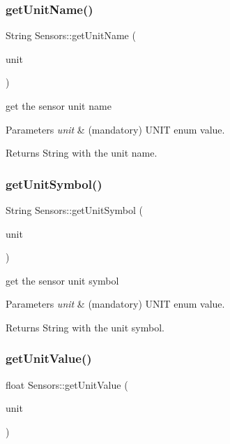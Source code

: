 \subsubsection{\texorpdfstring{get\+Unit\+Name()}{getUnitName()}}
{\footnotesize\ttfamily String Sensors\+::get\+Unit\+Name (\begin{DoxyParamCaption}\item[{U\+N\+IT}]{unit }\end{DoxyParamCaption})}



get the sensor unit name 


\begin{DoxyParams}{Parameters}
{\em unit} & (mandatory) U\+N\+IT enum value. \\
\hline
\end{DoxyParams}
\begin{DoxyReturn}{Returns}
String with the unit name. 
\end{DoxyReturn}
\mbox{\label{classSensors_a365a45dc5c9ab598cfc206368579b94a}} 
\subsubsection{\texorpdfstring{get\+Unit\+Symbol()}{getUnitSymbol()}}
{\footnotesize\ttfamily String Sensors\+::get\+Unit\+Symbol (\begin{DoxyParamCaption}\item[{U\+N\+IT}]{unit }\end{DoxyParamCaption})}



get the sensor unit symbol 


\begin{DoxyParams}{Parameters}
{\em unit} & (mandatory) U\+N\+IT enum value. \\
\hline
\end{DoxyParams}
\begin{DoxyReturn}{Returns}
String with the unit symbol. 
\end{DoxyReturn}
\mbox{\label{classSensors_a7e75dd4e3f2e655a9961f57650cbf749}} 
\subsubsection{\texorpdfstring{get\+Unit\+Value()}{getUnitValue()}}
{\footnotesize\ttfamily float Sensors\+::get\+Unit\+Value (\begin{DoxyParamCaption}\item[{U\+N\+IT}]{unit }\end{DoxyParamCaption})}



